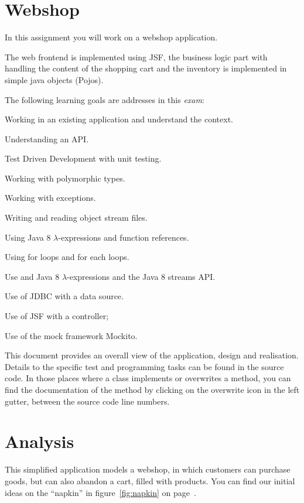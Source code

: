 \section{Webshop}

In this assignment you will work on a webshop application.

The web frontend is implemented using JSF, the business logic part
with handling the content of the shopping 
cart and the inventory is implemented in simple java objects (Pojos).

The following learning goals are addresses in this \textit{exam}:
\begin{itemize*}
\item Working in an existing application and understand the context.
\item Understanding an API.
\item Test Driven Development with unit testing.
\item Working with polymorphic types.
\item Working with exceptions.
\item Writing and reading object stream files.
\item Using Java 8 $\lambda$-expressions and function references.
\item Using for loops and for each loops.
\item Use and Java 8 $\lambda$-expressions and the Java 8 streams API.
\item Use of JDBC with a data source.
\item Use of JSF with a controller;%
\item Use of the mock framework Mockito.
\end{itemize*}

This document provides an overall view of the application, design and
realisation. Details to the specific test and programming tasks can be
found in the source code. In those places where a class implements or
overwrites a method, you can find the documentation of the method by
clicking on the overwrite icon in the left gutter, between the source
code line numbers. 

\section{Analysis}
This simplified application models a webshop, in which customers can
purchase goods, but can also abandon a cart, filled with products. You
can find our initial ideas on the ``napkin'' in
figure~\ref{fig:napkin} on page~\pageref{fig:napkin}.

